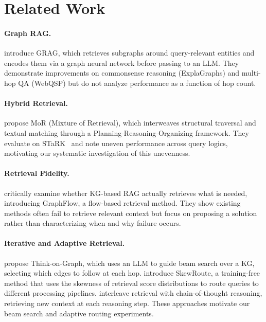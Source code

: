 \documentclass[11pt]{article}
\begin{document}
\section{Related Work}

\paragraph{Graph RAG.} \citet{hu2024grag} introduce GRAG, which retrieves subgraphs around query-relevant entities and encodes them via a graph neural network before passing to an LLM. They demonstrate improvements on commonsense reasoning (ExplaGraphs) and multi-hop QA (WebQSP) but do not analyze performance as a function of hop count.

\paragraph{Hybrid Retrieval.} \citet{yue2025mor} propose MoR (Mixture of Retrieval), which interweaves structural traversal and textual matching through a Planning-Reasoning-Organizing framework. They evaluate on STaRK~\citep{wu2024stark} and note uneven performance across query logics, motivating our systematic investigation of this unevenness.

\paragraph{Retrieval Fidelity.} \citet{yu2025graphflow} critically examine whether KG-based RAG actually retrieves what is needed, introducing GraphFlow, a flow-based retrieval method. They show existing methods often fail to retrieve relevant context but focus on proposing a solution rather than characterizing when and why failure occurs.

\paragraph{Iterative and Adaptive Retrieval.} \citet{sun2024tog} propose Think-on-Graph, which uses an LLM to guide beam search over a KG, selecting which edges to follow at each hop. \citet{wang2025skewroute} introduce SkewRoute, a training-free method that uses the skewness of retrieval score distributions to route queries to different processing pipelines. \citet{trivedi2023ircot} interleave retrieval with chain-of-thought reasoning, retrieving new context at each reasoning step. These approaches motivate our beam search and adaptive routing experiments.
\end{document}

